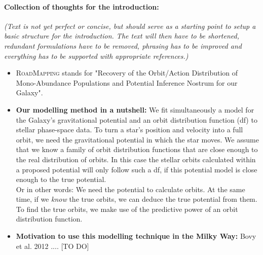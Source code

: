 \documentclass[12pt,preprint]{aastex}
\begin{document}
\paragraph{Collection of thoughts for the introduction:} \textit{(Text is not yet perfect or concise, but should serve as a starting point to setup a basic structure for the introduction. The text will then have to be shortened, redundant formulations have to be removed, phrasing has to be improved and everything has to be supported with appropriate references.)}
\begin{itemize}
\item \textsc{RoadMapping} stands for "Recovery of the Orbit/Action Distribution of Mono-Abundance Populations and Potential Inference Nostrum for our Galaxy".
\item \textbf{Our modelling method in a nutshell:} We fit simultaneously a model for the Galaxy's gravitational potential and an orbit distribution function (df) to stellar phase-space data. To turn a star's position and velocity into a full orbit, we need the gravitational potential in which the star moves. We assume that we know a family of orbit distribution functions that are close enough to the real distribution of orbits. In this case the stellar orbits calculated within a proposed potential will only follow such a df, if this potential model is close enough to the true potential.
\\Or in other words: We need the potential to calculate orbits. At the same time, if we \textit{know} the true orbits, we can deduce the true potential from them. To find the true orbits, we make use of the predictive power of an orbit distribution function.

\item \textbf{Motivation to use this modelling technique in the Milky Way:} Bovy et al. 2012 .... [TO DO]


\end{itemize}
\end{document}
